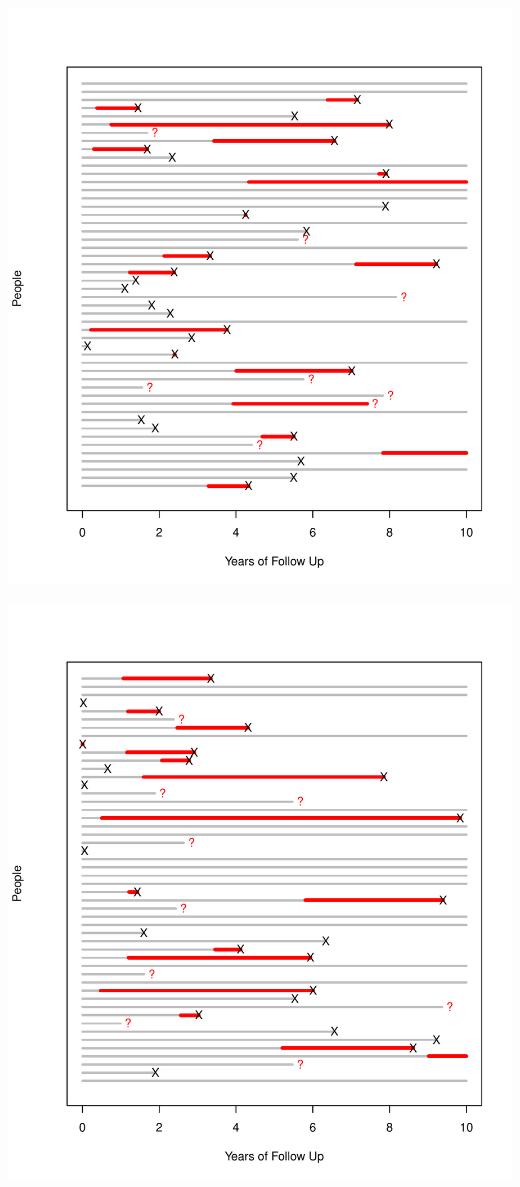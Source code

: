 \documentclass{article}
\begin{document}
\includegraphics{incidence-graphs-five}

\includegraphics{incidence-graphs-six}
\end{document}
